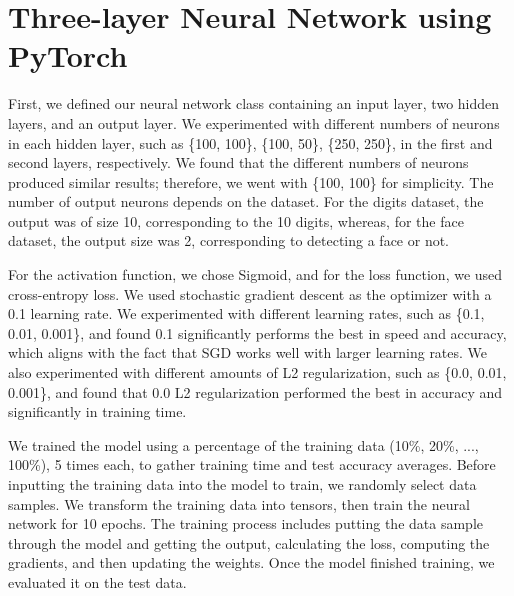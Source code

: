 \documentclass{article}
\begin{document}
\section*{Three-layer Neural Network using PyTorch}
First, we defined our neural network class containing an input layer, two hidden layers, and an output layer. We experimented with different numbers of neurons in each hidden layer, such as \{100, 100\}, \{100, 50\}, \{250, 250\}, in the first and second layers, respectively. We found that the different numbers of neurons produced similar results; therefore, we went with \{100, 100\} for simplicity. The number of output neurons depends on the dataset. For the digits dataset, the output was of size 10, corresponding to the 10 digits, whereas, for the face dataset, the output size was 2, corresponding to detecting a face or not.

\noindent For the activation function, we chose Sigmoid, and for the loss function, we used cross-entropy loss. We used stochastic gradient descent as the optimizer with a 0.1 learning rate. We experimented with different learning rates, such as \{0.1, 0.01, 0.001\}, and found 0.1 significantly performs the best in speed and accuracy, which aligns with the fact that SGD works well with larger learning rates. We also experimented with different amounts of L2 regularization, such as \{0.0, 0.01, 0.001\}, and found that 0.0 L2 regularization performed the best in accuracy and significantly in training time.

\noindent We trained the model using a percentage of the training data (10\%, 20\%, ..., 100\%), 5 times each, to gather training time and test accuracy averages. Before inputting the training data into the model to train, we randomly select data samples. We transform the training data into tensors, then train the neural network for 10 epochs. The training process includes putting the data sample through the model and getting the output, calculating the loss, computing the gradients, and then updating the weights. Once the model finished training, we evaluated it on the test data.
\end{document}
